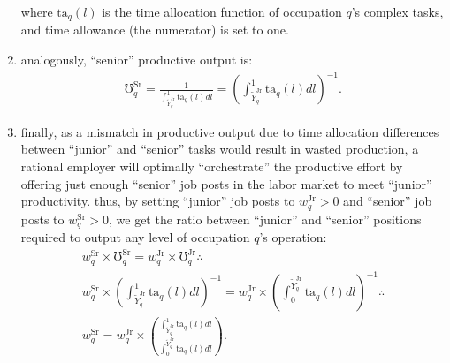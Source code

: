 \documentclass[hidelinks, nonatbib]{elsarticle}
\begin{document}
\begin{enumerate}
    where $\text{ta}_q(l)$ is the time allocation function of occupation $q$'s complex tasks, and time allowance (the numerator) is set to one.
    \item analogously, ``senior'' productive output is:
    \begin{gather}
        \mho_{q}^{\text{Sr}} =
        \frac{
            1
        }{
            \int_{\tilde{Y}_{q}^{\text{Jr}}}^{1}
            \text{ta}_q(l)
            dl
        } = 
        \left(
            \int_{\tilde{Y}_{q}^{\text{Jr}}}^{1}
                \text{ta}_q(l)
                dl
        \right) ^ {-1}
        .
    \end{gather}
    \item finally, as a mismatch in productive output due to time allocation differences between ``junior'' and ``senior'' tasks would result in wasted production, a rational employer will optimally ``orchestrate'' the productive effort by offering just enough ``senior'' job posts in the labor market to meet ``junior'' productivity. thus, by setting ``junior'' job posts to $w_{q}^{\text{Jr}} > 0$ and ``senior'' job posts to $w_{q}^{\text{Sr}} > 0$, we get the ratio between ``junior'' and ``senior'' positions required to output any level of occupation $q$'s operation:
    \begin{gather}
        w_{q}^{\text{Sr}} \times 
        \mho_{q}^{\text{Sr}} = 
        w_{q}^{\text{Jr}} \times 
        \mho_{q}^{\text{Jr}}
        \therefore
        \\
        w_{q}^{\text{Sr}} \times 
        \left(
            \int_{\tilde{Y}_{q}^{\text{Jr}}}^{1}
                \text{ta}_q(l)
                dl
        \right) ^ {-1}
        = 
        w_{q}^{\text{Jr}} \times 
        \left(
            \int_{0}^{\tilde{Y}_{q}^{\text{Jr}}}
                \text{ta}_q(l)
                dl
        \right) ^ {-1}
        \therefore
        \\
        w_{q}^{\text{Sr}}
        = 
        w_{q}^{\text{Jr}}
        \times
        \left(
            \frac{
                \int_{\tilde{Y}_{q}^{\text{Jr}}}^{1}
                    \text{ta}_q(l)
                    dl
            }{
                \int_{0}^{\tilde{Y}_{q}^{\text{Jr}}}
                    \text{ta}_q(l)
                    dl
            }
        \right)
        .
    \end{gather}


\end{enumerate}
\end{document}
